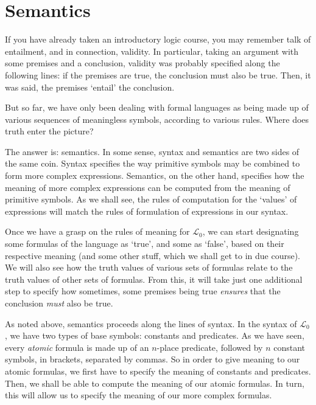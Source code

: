 \chapter{Semantics}

If you have already taken an introductory logic course, you may remember talk of entailment, and in connection, validity. In particular, taking an argument with some premises and a conclusion, validity was probably specified along the following lines: if the premises are true, the conclusion must also be true. Then, it was said, the premises `entail' the conclusion. 

But so far, we have only been dealing with formal languages as being made up of various sequences of meaningless symbols, according to various rules. Where does truth enter the picture? 

The answer is: semantics. In some sense, syntax and semantics are two sides of the same coin. Syntax specifies the way primitive symbols may be combined to form more complex expressions. Semantics, on the other hand, specifies how the meaning of more complex expressions can be computed from the meaning of primitive symbols. As we shall see, the rules of computation for the `values' of expressions will match the rules of formulation of expressions in our syntax. 

Once we have a grasp on the rules of meaning for $\mathcal{L}_0$, we can start designating some formulas of the language as `true', and some as `false', based on their respective meaning (and some other stuff, which we shall get to in due course). We will also see how the truth values of various sets of formulas relate to the truth values of other sets of formulas. From this, it will take just one additional step to specify how sometimes, some premises being true \textit{ensures} that the conclusion \textit{must} also be true. 


As noted above, semantics proceeds along the lines of syntax. In the syntax of $\mathcal{L}_0$, we have two types of base symbols: constants and predicates. As we have seen, every \textit{atomic} formula is made up of an $n$-place predicate, followed by $n$ constant symbols, in brackets, separated by commas. So in order to give meaning to our atomic formulas, we first have to specify the meaning of constants and predicates. Then, we shall be able to compute the meaning of our atomic formulas. In turn, this will allow us to specify the meaning of our more complex formulas. 

